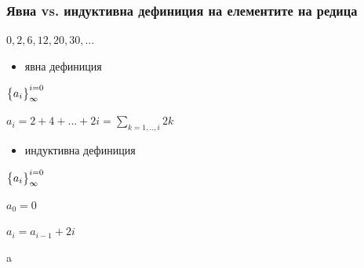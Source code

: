 \documentclass{beamer}
\begin{document}
\begin{frame}[fragile]
\frametitle{Явна vs. индуктивна дефиниция на елементите на редица}

\begin{center}
$0,2,6,12,20,30,...$ 
\end{center}

\pause

\begin{itemize}
  \item явна дефиниция
\end{itemize}

\begin{center}
  $\big{\{}a_i\big{\}}_\infty^{i=0}$

  \vspace{10px}

  $a_i = 2 + 4 + ... + 2i = \sum\limits_{k=1,..,i}2k$

\end{center}

\pause

\begin{itemize}
  \item индуктивна дефиниция
\end{itemize}


\begin{center}
  $\big{\{}a_i\big{\}}_\infty^{i=0}$

  \vspace{10px}

  $a_0 = 0$

  $a_i = a_{i-1} + 2i$
\end{center}

a

\end{frame}
\end{document}
